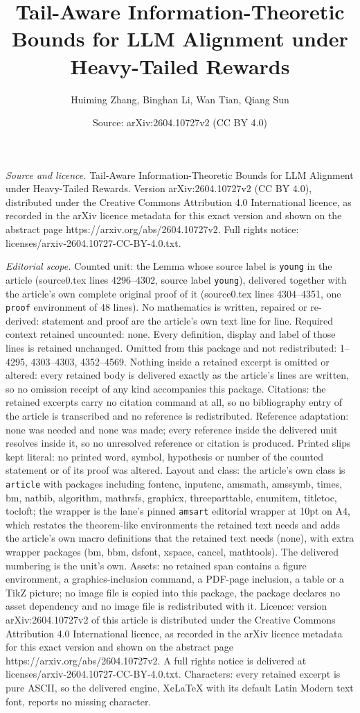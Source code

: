 \documentclass[10pt,a4paper]{amsart}
\title[Tail-Aware Information-Theoretic Bounds for LLM Alignment un]{Tail-Aware Information-Theoretic Bounds for LLM Alignment under Heavy-Tailed Rewards}
\author{Huiming Zhang, Binghan Li, Wan Tian, Qiang Sun}
\date{Source: arXiv:2604.10727v2 (CC BY 4.0)}
\begin{document}
\maketitle

\noindent\emph{Source and licence.} Tail-Aware Information-Theoretic Bounds for LLM Alignment under Heavy-Tailed Rewards. Version arXiv:2604.10727v2 (CC BY 4.0), distributed under the Creative Commons Attribution 4.0 International licence, as recorded in the arXiv licence metadata for this exact version and shown on the abstract page https://arxiv.org/abs/2604.10727v2. Full rights notice: licenses/arxiv-2604.10727-CC-BY-4.0.txt.\par\smallskip

\noindent\textit{Editorial scope.} Counted unit: the Lemma whose source label is \texttt{young} in the article (source0.tex lines 4296--4302, source label \texttt{young}), delivered together with the article's own complete original proof of it (source0.tex lines 4304--4351, one \texttt{proof} environment of 48 lines). No mathematics is written, repaired or re-derived: statement and proof are the article's own text line for line. Required context retained uncounted: none. Every definition, display and label of those lines is retained unchanged. Omitted from this package and not redistributed: 1--4295, 4303--4303, 4352--4569. Nothing inside a retained excerpt is omitted or altered: every retained body is delivered exactly as the article's lines are written, so no omission receipt of any kind accompanies this package. Citations: the retained excerpts carry no citation command at all, so no bibliography entry of the article is transcribed and no reference is redistributed. Reference adaptation: none was needed and none was made; every reference inside the delivered unit resolves inside it, so no unresolved reference or citation is produced. Printed slips kept literal: no printed word, symbol, hypothesis or number of the counted statement or of its proof was altered. Layout and class: the article's own class is \texttt{article} with packages including fontenc, inputenc, amsmath, amssymb, times, bm, natbib, algorithm, mathrsfs, graphicx, threeparttable, enumitem, titletoc, tocloft; the wrapper is the lane's pinned \texttt{amsart} editorial wrapper at 10pt on A4, which restates the theorem-like environments the retained text needs and adds the article's own macro definitions that the retained text needs (none), with extra wrapper packages (bm, bbm, dsfont, xspace, cancel, mathtools). The delivered numbering is the unit's own. Assets: no retained span contains a figure environment, a graphics-inclusion command, a PDF-page inclusion, a table or a TikZ picture; no image file is copied into this package, the package declares no asset dependency and no image file is redistributed with it. Licence: version arXiv:2604.10727v2 of this article is distributed under the Creative Commons Attribution 4.0 International licence, as recorded in the arXiv licence metadata for this exact version and shown on the abstract page https://arxiv.org/abs/2604.10727v2. A full rights notice is delivered at licenses/arxiv-2604.10727-CC-BY-4.0.txt. Characters: every retained excerpt is pure ASCII, so the delivered engine, XeLaTeX with its default Latin Modern text font, reports no missing character.
\end{document}
